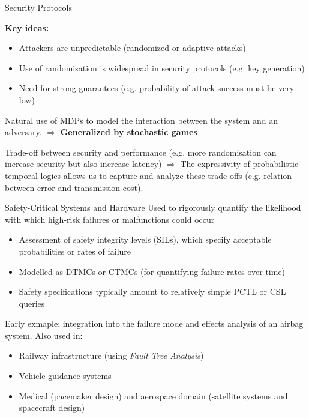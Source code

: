 \documentclass[dvipsnames]{beamer}
\begin{document}
\begin{frame}{Security Protocols}

    \textbf{Key ideas: }
    \begin{itemize}
        \item Attackers are unpredictable (randomized or adaptive attacks)
        \item Use of randomisation is widespread in security protocols (e.g. key generation)
        \item Need for strong guarantees (e.g. probability of attack success must be very low)
    \end{itemize}

    Natural use of MDPs to model the interaction between the system
    and an adversary. $\Rightarrow$ \textbf{Generalized by stochastic games}



    Trade-off between security and performance (e.g. more randomisation can increase security
    but also increase latency) $\Rightarrow$ The expressivity of probabilistic temporal logics allows us to
    capture and analyze these trade-offs (e.g. relation between error and transmission cost).
\end{frame}

\begin{frame}{Safety-Critical Systems and Hardware}
    Used to rigorously quantify the
    likelihood with which high-risk failures or malfunctions could occur
    \begin{itemize}
        \item Assessment of safety integrity levels (SILs), which specify acceptable
              probabilities or rates of failure
        \item Modelled as DTMCs or CTMCs (for quantifying failure rates over time)
        \item Safety specifications typically amount to relatively simple PCTL or CSL
              queries
    \end{itemize}

    Early exmaple: integration into the failure mode and effects analysis of an airbag system.
    Also used in:
    \begin{itemize}
        \item Railway infrastructure (using {\textit{Fault Tree Analysis}})
        \item Vehicle guidance systems
        \item Medical (pacemaker design) and aerospace domain (satellite systems and spacecraft design)
    \end{itemize}
\end{frame}
\end{document}
